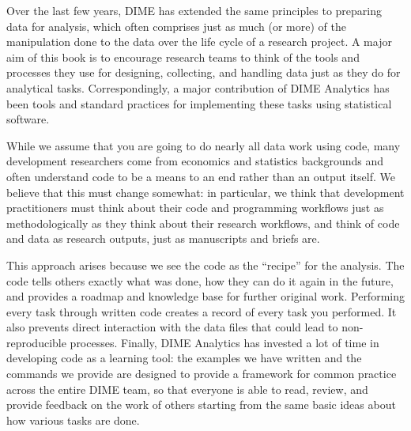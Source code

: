 {Over the last few years, DIME has extended the same principles to preparing data for analysis,
which often comprises just as much (or more) of the manipulation done to the data
over the life cycle of a research project.
A major aim of this book is to encourage research teams
to think of the tools and processes they use
for designing, collecting, and handling data
just as they do for analytical tasks.
Correspondingly, a major contribution of DIME Analytics
has been tools and standard practices
for implementing these tasks using statistical software.

While we assume that you are going to do nearly all data work using code,
many development researchers come from economics and statistics backgrounds
and often understand code to be a means to an end rather than an output itself.
We believe that this must change somewhat:
in particular, we think that development practitioners
must think about their code and programming workflows
just as methodologically as they think about their research workflows,
and think of code and data as research outputs, just as manuscripts and briefs are.

This approach arises because we see the code as the ``recipe'' for the analysis.
The code tells others exactly what was done,
how they can do it again in the future,
and provides a roadmap and knowledge base for further original work.
Performing every task through written code
creates a record of every task you performed.
It also prevents direct interaction
with the data files that could lead to non-reproducible processes.
Finally, DIME Analytics has invested a lot of time in developing code as a learning tool:
the examples we have written and the commands we provide
are designed to provide a framework for common practice
across the entire DIME team, so that everyone is able to
read, review, and provide feedback on the work of others
starting from the same basic ideas about how various tasks are done.

}
